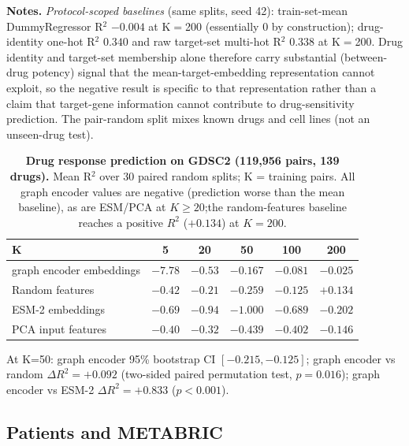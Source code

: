 \documentclass[11pt,a4paper]{article}
\begin{document}
\begin{table}[H]
\centering
\caption{\textbf{Drug response prediction on GDSC2 (119,956 pairs, 139 drugs).} Mean R$^2$ over 30 paired random splits; K = training pairs. All graph encoder values are negative (prediction worse than the mean baseline), as are ESM/PCA at $K\geq 20$;the random-features baseline reaches a positive $R^2$ ($+0.134$) at $K=200$.}

\smallskip
{\footnotesize \noindent \textbf{Notes.} \textit{Protocol-scoped baselines} (same splits, seed 42): train-set-mean DummyRegressor R$^2$ $-0.004$ at K$=$200 (essentially 0 by construction); drug-identity one-hot R$^2$ $0.340$ and raw target-set multi-hot R$^2$ $0.338$ at K$=$200. Drug identity and target-set membership alone therefore carry substantial (between-drug potency) signal that the mean-target-embedding representation cannot exploit, so the negative result is specific to that representation rather than a claim that target-gene information cannot contribute to drug-sensitivity prediction. The pair-random split mixes known drugs and cell lines (not an unseen-drug test).}

\label{tab:s6}
\footnotesize
\begin{tabular}{@{}lccccc@{}}
\toprule
\textbf{K} & \textbf{5} & \textbf{20} & \textbf{50} & \textbf{100} & \textbf{200} \\
\midrule
graph encoder embeddings & $-7.78$ & $-0.53$ & $-0.167$ & $-0.081$ & $-0.025$ \\
Random features & $-0.42$ & $-0.21$ & $-0.259$ & $-0.125$ & $+0.134$ \\
ESM-2 embeddings & $-0.69$ & $-0.94$ & $-1.000$ & $-0.689$ & $-0.202$ \\
PCA input features & $-0.40$ & $-0.32$ & $-0.439$ & $-0.402$ & $-0.146$ \\
\bottomrule
\end{tabular}
\end{table}



\noindent At K=50: graph encoder 95\% bootstrap CI $[-0.215, -0.125]$; graph encoder vs random $\Delta R^2 = +0.092$ (two-sided paired permutation test, $p = 0.016$); graph encoder vs ESM-2 $\Delta R^2 = +0.833$ ($p < 0.001$).

\FloatBarrier



\FloatBarrier


\subsection{Patients and METABRIC}
\end{document}
